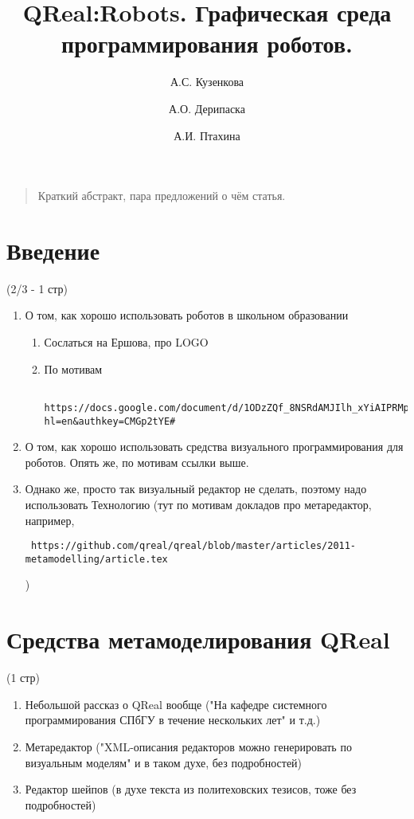 \documentclass[a5paper]{article}
\title{QReal:Robots. Графическая среда программирования роботов.}
\author{А.С. Кузенкова \and А.О. Дерипаска \and А.И. Птахина}
\date{}
\begin{document}
\maketitle
\thispagestyle{empty}

\begin{quote}
\small\noindent
Краткий абстракт, пара предложений о чём статья.
\end{quote}

\section*{Введение} (2/3 - 1 стр)
\begin{enumerate}
  \item О том, как хорошо использовать роботов в школьном образовании
  \begin{enumerate}
    \item Сослаться на Ершова, про LOGO
    \item По мотивам \begin{verbatim} https://docs.google.com/document/d/1ODzZQf_8NSRdAMJIlh_xYiAIPRMpSnCKz6ZBDv0Ehpg/edit?hl=en&authkey=CMGp2tYE# \end{verbatim}
  \end{enumerate}
  \item О том, как хорошо использовать средства визуального программирования для роботов. Опять же, по мотивам ссылки выше.
  \item Однако же, просто так визуальный редактор не сделать, поэтому надо использовать Технологию (тут по мотивам докладов про метаредактор, например, \begin{verbatim} https://github.com/qreal/qreal/blob/master/articles/2011-metamodelling/article.tex \end{verbatim} )
\end{enumerate}

\section{Средства метамоделирования QReal} (1 стр)
\begin{enumerate}
  \item Небольшой рассказ о QReal вообще ("На кафедре системного программирования СПбГУ в течение нескольких лет" и т.д.)
  \item Метаредактор ("XML-описания редакторов можно генерировать по визуальным моделям" и в таком духе, без подробностей)
  \item Редактор шейпов (в духе текста из политеховских тезисов, тоже без подробностей)
\end{enumerate}
\end{document}
